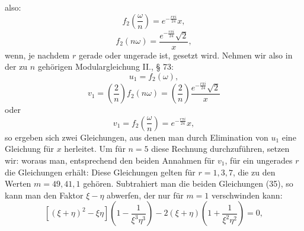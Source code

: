 also:
\[ f_2\left(\frac{\omega}{n}\right) = e^{-\frac{r\pi i}{24}}x, \]
\[ f_2(n\omega) = \frac{e^{-\frac{r\pi i}{24}}\sqrt2}{x}, \]
wenn, je nachdem $r$ gerade oder ungerade ist,
gesetzt wird. Nehmen wir also in der zu $n$ gehörigen Modulargleichung
 II., § 73:
\[ u_1 = f_2(\omega), \]
\[ v_1 = \left(\frac2n\right) f_2(n\omega) = \left(\frac2n\right) \frac{e^{-\frac{r\pi i}{24}}\sqrt2}{x} \]
oder
\[ v_1 = f_2\left(\frac{\omega}{n}\right) = e^{-\frac{r\pi i}{24}}x, \]
so ergeben sich zwei Gleichungen, aus denen man durch Elimination
 von $u_1$ eine Gleichung für $x$ herleitet.
Um für $n = 5$ diese Rechnung durchzuführen, setzen wir:
woraus man, entsprechend den beiden Annahmen für $v_1$, für ein
ungerades $r$ die Gleichungen erhält:
Diese Gleichungen gelten für $r = 1, 3, 7$, die zu den Werten
$m = 49, 41, 1$ gehören.
Subtrahiert man die beiden Gleichungen (35), so kann man
den Faktor $\xi - \eta$ abwerfen, der nur für $m = 1$ verschwinden
kann:
\[ [(\xi+\eta)^2 - \xi\eta]\left(1-\frac1{\xi^3\eta^3}\right) - 2(\xi+\eta)\left(1+\frac1{\xi^2\eta^2}\right) = 0, \]
